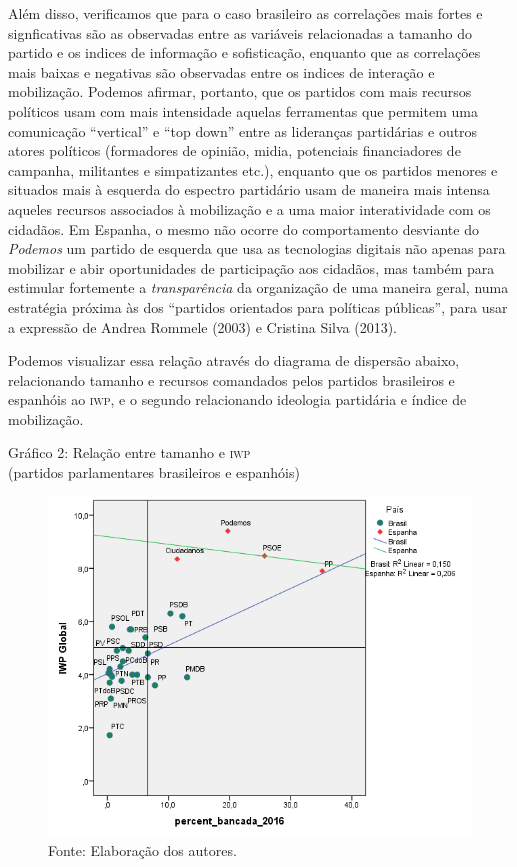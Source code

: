 Além disso, verificamos que para o caso brasileiro as correlações mais
fortes e signficativas são as observadas entre as variáveis relacionadas
a tamanho do partido e os indices de informação e sofisticação, enquanto
que as correlações mais baixas e negativas são observadas entre os
indices de interação e mobilização. Podemos afirmar, portanto, que os
partidos com mais recursos políticos usam com mais intensidade aquelas
ferramentas que permitem uma comunicação ``vertical'' e ``top down'' entre
as lideranças partidárias e outros atores políticos (formadores de
opinião, midia, potenciais financiadores de campanha, militantes e
simpatizantes etc.), enquanto que os partidos menores e situados mais à
esquerda do espectro partidário usam de maneira mais intensa aqueles
recursos associados à mobilização e a uma maior interatividade com os
cidadãos. Em Espanha, o mesmo não ocorre do comportamento desviante do
\emph{Podemos} um partido de esquerda que usa as tecnologias digitais
não apenas para mobilizar e abir oportunidades de participação aos
cidadãos, mas também para estimular fortemente a \emph{transparência} da
organização de uma maneira geral, numa estratégia próxima às dos
``partidos orientados para políticas públicas'', para usar a expressão
de Andrea Rommele (2003) e Cristina Silva (2013).

Podemos visualizar essa relação através do diagrama de dispersão abaixo,
relacionando tamanho e recursos comandados pelos partidos brasileiros e
espanhóis ao \textsc{iwp}, e o segundo relacionando ideologia partidária e índice
de mobilização.

\begin{center}
Gráfico 2: Relação entre tamanho e \textsc{iwp}\\ (partidos parlamentares
brasileiros e espanhóis)

\begin{figure}[!ht]
\centering
 \includegraphics[width=\textwidth]{./imgs/graf2.png}
\caption{Fonte: Elaboração dos autores.}
\end{figure}
\end{center}

